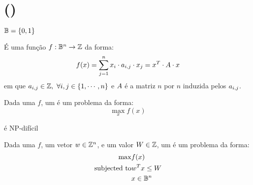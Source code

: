 \section{\maxkqbffull (\maxkqbf)}
\label{appendix:max-kqbf}

\begin{defn}
    $\mathbb{B} = \left\{0, 1\right\}$
\end{defn}

\begin{defn}
    É uma função $f: \mathbb{B}^n \rightarrow \mathbb{Z}$ da forma:
    $$
        f(x)
        = \displaystyle\sum\limits_{j = 1}^{n} x_i \cdot a_{i,j} \cdot x_j
        = x^{T} \cdot A \cdot x
    $$
    em que $a_{i,j} \in \mathbb{Z}, \ \forall i,j \in \left\{1, \cdots, n\right\}$ e $A$ é a matriz $n$ por $n$ induzida pelos $a_{i,j}$.
\end{defn}

\begin{defn}
Dada uma \qbf $f$, um \maxqbf é um problema da forma:
$$
    \max\limits_{x} f(x)
$$
\end{defn}

\begin{fact}
\maxqbf é NP-difícil \cite{bib:qbf}
\end{fact}

\begin{defn}
Dada uma \qbf $f$, um vetor $w \in \mathbb{Z}^n$, e um valor $W \in \mathbb{Z}$, um \maxkqbf é um problema da forma:
\begin{eqnarray*}
    \max & f(x) \\
    \mbox{subjected to} & w^{T} x \leq W \\
    & x \in \mathbb{B}^n
\end{eqnarray*}
\end{defn}
